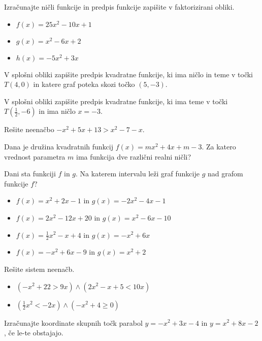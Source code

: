 \begin{naloga}
    Izračunajte ničli funkcije in predpis funkcije zapišite v faktorizirani obliki.
    \begin{itemize}
        \item $f(x)=25x^2-10x+1$
        \item $g(x)=x^2-6x+2$
        \item $h(x)=-5x^2+3x$
    \end{itemize}
\end{naloga}

\begin{naloga}
    V splošni obliki zapišite predpis kvadratne funkcije, ki ima ničlo in teme v točki $T(4,0)$ in katere graf poteka skozi točko $(5,-3)$.
\end{naloga}

\begin{naloga}
    V splošni obliki zapišite predpis kvadratne funkcije, ki ima teme v točki $T(\frac{1}{2},-6)$ in ima ničlo $x=-3$.
\end{naloga}

\begin{naloga}
    Rešite neenačbo $-x^2+5x+13>x^2-7-x$.
\end{naloga}

\begin{naloga}
    Dana je družina kvadratnih funkcij $f(x)=mx^2+4x+m-3$. Za katero vrednost parametra $m$ ima funkcija dve različni realni ničli?
\end{naloga}

\begin{naloga}
    Dani sta funkciji $f$ in $g$. Na katerem intervalu leži graf funkcije $g$ nad grafom funkcije $f$?
    \begin{itemize}
        \item $f(x)=x^2+2x-1$ in $g(x)=-2x^2-4x-1$
        \item $f(x)=2x^2-12x+20$ in $g(x)=x^2-6x-10$
        \item $f(x)=\frac{1}{2}x^2-x+4$ in $g(x)=-x^2+6x$
        \item $f(x)=-x^2+6x-9$ in $g(x)=x^2+2$
    \end{itemize}
\end{naloga}

\begin{naloga}
    Rešite sistem neenačb.
    \begin{itemize}
        \item $(-x^2+22>9x)\land(2x^2-x+5<10x)$
        \item $(\frac{1}{2}x^2<-2x)\land(-x^2+4\geq 0)$
    \end{itemize}
\end{naloga}

\begin{naloga}
    Izračunajte koordinate skupnih točk parabol $y=-x^2+3x-4$ in $y=x^2+8x-2$, če le-te obstajajo.
\end{naloga}